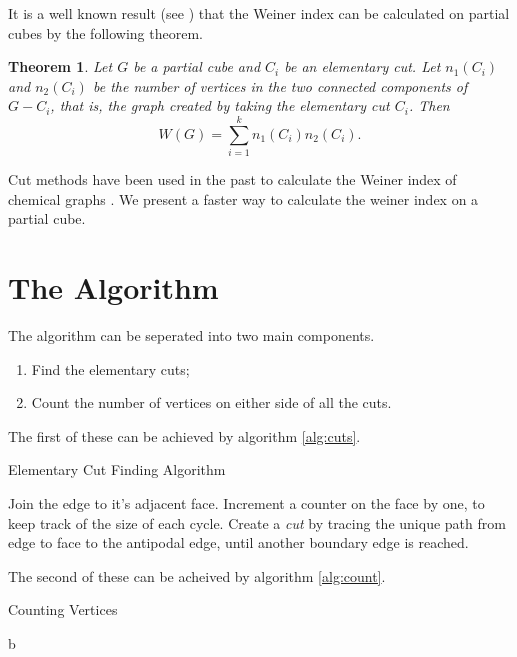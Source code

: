\documentclass[11pt,a4paper]{article}
\newtheorem{theorem}{Theorem}
\begin{document}
It is a well known result (see \cite{K2015}) that the Weiner index can be calculated on partial cubes by the following theorem.

\begin{theorem}
Let $G$ be a partial cube and $C_i$ be an elementary cut. Let $n_1(C_i)$ and $n_2(C_i)$ be the number of vertices in the two connected components of $G-C_i$, that is, the graph created by taking the elementary cut $C_i$. Then $$W(G)=\sum_{i=1}^kn_1(C_i)n_2(C_i).$$
\end{theorem}

Cut methods have been used in the past to calculate the Weiner index of chemical graphs \cite{K1997}. We present a faster way to calculate the weiner index on a partial cube.

\section{The Algorithm} \label{sec:algorithm}

The algorithm can be seperated into two main components.

\begin{enumerate}
\item Find the elementary cuts;
\item Count the number of vertices on either side of all the cuts.
\end{enumerate}

The first of these can be achieved by algorithm \ref{alg:cuts}.

\begin{algorithm}
  \caption{Elementary Cut Finding Algorithm}\label{alg:cuts}
  \begin{algorithmic}[1]
      	\State Join the edge to it's adjacent face.
      	\State Increment a counter on the face by one, to keep track of the size of each cycle.
      \EndFor
      	\State Create a \emph{cut} by tracing the unique path from edge to face to the antipodal edge, until another boundary edge is reached.
      \EndFor
  \end{algorithmic}
\end{algorithm}

The second of these can be acheived by algorithm \ref{alg:count}.

\begin{algorithm}
	\caption{Counting Vertices}\label{alg:count}
	\begin{algorithmic}[1]
			\State b
		\EndFor
	\end{algorithmic}
\end{algorithm}
\end{document}
